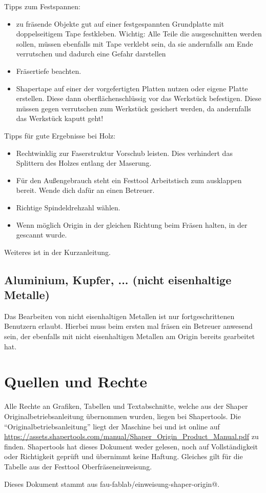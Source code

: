 \documentclass{\basedir/fablab-document}
\renewcommand{\todo}[1]{\textbf{\color{red}{TODO: #1}}}
\begin{document}
Tipps zum Festspannen:
\begin{itemize}
    \item zu fräsende Objekte gut auf einer festgespannten Grundplatte mit
        doppelseitigem Tape festkleben. Wichtig: Alle Teile die ausgeschnitten werden
        sollen, müssen ebenfalls mit Tape verklebt sein, da sie andernfalls am
        Ende verrutschen und dadurch eine Gefahr darstellen
    \item Fräsertiefe beachten.
    \item Shapertape auf einer der vorgefertigten Platten nutzen oder eigene
        Platte erstellen. Diese dann oberflächenschlüssig vor das Werkstück
        befestigen. Diese müssen gegen verrutschen zum Werkstück gesichert
        werden, da andernfalls das Werkstück kaputt geht!
\end{itemize}

Tipps für gute Ergebnisse bei Holz:
\begin{itemize}
    \item Rechtwinklig zur Faserstruktur Vorschub leisten. Dies verhindert
        das Splittern des Holzes entlang der Maserung.
    \item Für den Außengebrauch steht ein Festtool Arbeitstisch zum
        ausklappen bereit. Wende dich dafür an einen Betreuer.
    \item Richtige Spindeldrehzahl wählen.
    \item Wenn möglich Origin in der gleichen Richtung beim Fräsen
        halten, in der gescannt wurde.
\end{itemize}

Weiteres ist in der Kurzanleitung.

\subsection{Aluminium, Kupfer, ... (nicht eisenhaltige Metalle)}
Das Bearbeiten von nicht eisenhaltigen Metallen ist nur fortgeschrittenen
Benutzern erlaubt. Hierbei muss beim ersten mal fräsen ein Betreuer anwesend
sein, der ebenfalls mit nicht eisenhaltigen Metallen am Origin bereits gearbeitet hat.

\section{Quellen und Rechte}
\label{quellen}
Alle Rechte an Grafiken, Tabellen und Textabschnitte, welche aus der Shaper
Originalbetriebsanleitung übernommen wurden, liegen bei Shapertools. Die
\enquote{Originalbetriebsanleitung} liegt der Maschine bei und ist online auf
\url{https://assets.shapertools.com/manual/Shaper_Origin_Product_Manual.pdf}
zu finden. Shapertools hat dieses Dokument weder gelesen, noch auf Vollständigkeit
oder Richtigkeit geprüft und übernimmt keine Haftung.
Gleiches gilt für die Tabelle aus der Festtool Oberfräseneinweisung.

Dieses Dokument stammt aus fau-fablab/einweisung-shaper-origin@\Revision{}.

\todo{Klären, ob und wo CC-Lizenz gesetzt werden kann, dann ccLicense-Block einbinden.}
\end{document}
